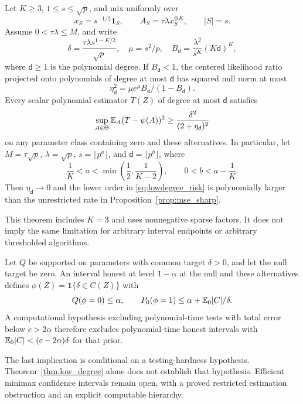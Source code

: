 \begin{theorem}\label{thm:low_degree}
Let $K\ge3$, $1\le s\le\sqrt p$, and mix uniformly over
\[
 x_S=s^{-1/2}\mathbf1_S,\qquad
 A_S=\tau\lambda x_S^{\otimes K},\qquad |S|=s.
\]
Assume $0<\tau\lambda\le M$, and write
\[
 \delta=\frac{\tau\lambda s^{1-K/2}}{\sqrt p},\quad
 \mu=s^2/p,\quad B_{\mathsf d}=\frac{\lambda^2}{s^K}(K\mathsf d)^K,
\]
where $\mathsf d\ge1$ is the polynomial degree. If $B_{\mathsf d}<1$, the centered likelihood ratio projected onto polynomials of degree at most $\mathsf d$ has squared null norm at most
\[
 \eta_{\mathsf d}^2=\mu e^\mu B_{\mathsf d}/(1-B_{\mathsf d}).
\]
Every scalar polynomial estimator $T(Z)$ of degree at most $\mathsf d$ satisfies
\begin{equation}\label{eq:lowdegree_risk}
 \sup_{A\in\Theta}\mathbb E_A(T-\psi(A))^2
       \ge\frac{\delta^2}{(2+\eta_{\mathsf d})^2}
\end{equation}
on any parameter class containing zero and these alternatives.
In particular, let $M=\tau\sqrt p$, $\lambda=\sqrt p$,
$s=\lfloor p^a\rfloor$, and $\mathsf d=\lfloor p^b\rfloor$, where
\[
 \frac1K<a<\min\left(\frac12,\frac1{K-2}\right),
 \qquad 0<b<a-\frac1K.
\]
Then $\eta_{\mathsf d}\to0$ and the lower order in \eqref{eq:lowdegree_risk} is polynomially larger than the unrestricted rate in Proposition~\ref{prop:mse_sharp}.
\end{theorem}

This theorem includes $K=3$ and uses nonnegative sparse factors. It does not imply the same limitation for arbitrary interval endpoints or arbitrary thresholded algorithms.

\begin{proposition}\label{prop:ci_detection}
Let $Q$ be supported on parameters with common target $\delta>0$, and let the null target be zero.
An interval honest at level $1-\alpha$ at the null and these alternatives defines
$\phi(Z)=\mathbf1\{\delta\in C(Z)\}$ with
\[
 Q(\phi=0)\le\alpha,\qquad
 P_0(\phi=1)\le\alpha+\mathbb E_0|C|/\delta.
\]
A computational hypothesis excluding polynomial-time tests with total error below $c>2\alpha$ therefore excludes polynomial-time honest intervals with
$\mathbb E_0|C|<(c-2\alpha)\delta$ for that prior.
\end{proposition}

The last implication is conditional on a testing-hardness hypothesis.
Theorem~\ref{thm:low_degree} alone does not establish that hypothesis.
Efficient minimax confidence intervals remain open, with a proved restricted estimation obstruction and an explicit computable hierarchy.
